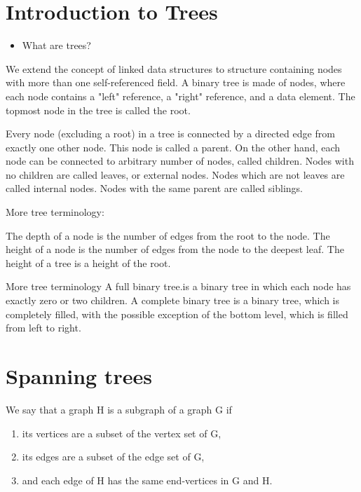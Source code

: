 \documentclass[12pt]{article}
\begin{document}

\section{Introduction to Trees}
\begin{itemize}
\item What are trees?
\end{itemize}


We extend the concept of linked data structures to structure containing nodes with more than one self-referenced field. A binary tree is made of nodes, where each node contains a "left" reference, a "right" reference, and a data element. The topmost node in the tree is called the root.


Every node (excluding a root) in a tree is connected by a directed edge from exactly one other node. This node is called a parent. On the other hand, each node can be connected to arbitrary number of nodes, called children. Nodes with no children are called leaves, or external nodes. Nodes which are not leaves are called internal nodes. Nodes with the same parent are called siblings.

   
More tree terminology:

The depth of a node is the number of edges from the root to the node.
The height of a node is the number of edges from the node to the deepest leaf.
The height of a tree is a height of the root.


More tree terminology
A full binary tree.is a binary tree in which each node has exactly zero or two children.
A complete binary tree is a binary tree, which is completely filled, with the possible exception of the bottom level, which is filled from left to right.


\section{Spanning trees}
We say that a graph H is a subgraph of a graph G if

\begin{enumerate}
\item its vertices are
a subset of the vertex set of G, 
\item its edges are a subset of the edge set
of G, 
\item and each edge of H has the same end-vertices in G and H.
\end{enumerate} 
\end{document}

